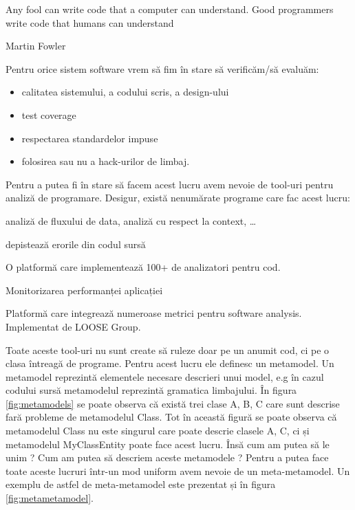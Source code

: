 \epigraph{Any fool can write code that a computer can understand. Good
programmers write code that humans can understand}{Martin Fowler}

	Pentru orice sistem software vrem să fim în stare să verificăm/să evaluăm: 
	\begin{itemize}
	    \item calitatea sistemului, a codului scris, a design-ului
		\item test coverage  
		\item respectarea standardelor impuse 
		\item folosirea sau nu a  hack-urilor de limbaj.
	\end{itemize}
	Pentru a putea fi în stare să facem acest lucru avem nevoie de tool-uri pentru
analiză de programare.
Desigur, există nenumărate programe care fac acest lucru:
	  \begin{description}[labelindent=2cm]
	  \item[Wala IBM] {analiză de fluxului de data, analiză cu respect la context,
\ldots{} }
	  \item[FindBugs]  depistează erorile  din  codul sursă
	  \item[IntelliJ]   O platformă care implementează 100+ de analizatori pentru
 cod.
	  \item[SonarJ]  Monitorizarea performanței aplicației
	  \item[CodePro] {Platformă care integrează numeroase metrici pentru software
analysis. Implementat de LOOSE Group.}
	  \end{description}
         Toate aceste tool-uri nu sunt create să ruleze doar pe un anumit cod, 
ci pe o clasa întreagă de programe. Pentru acest lucru ele definesc un metamodel.
Un metamodel reprezintă elementele necesare descrieri unui model, e.g în cazul 
codului sursă metamodelul reprezintă gramatica limbajului.	În figura \ref{fig:metamodels} 
se poate observa că există trei clase A, B, C care sunt descrise fară probleme
de metamodelul Class. Tot în această figură se poate observa că metamodelul 
Class nu este singurul care poate descrie clasele A, C, ci și metamodelul
MyClassEntity poate face acest lucru. Însă cum am putea să le unim ?
Cum am putea să descriem aceste metamodele ? Pentru a putea face
toate aceste lucruri într-un mod uniform avem nevoie de un meta-metamodel. 
Un exemplu de astfel de meta-metamodel este prezentat și în figura
\ref{fig:metametamodel}. 


